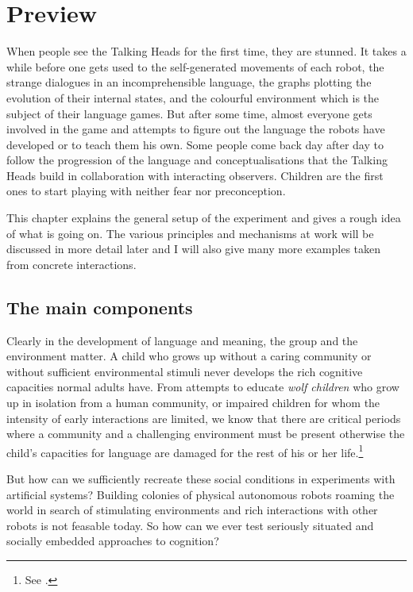 \chapter{Preview}
\label{chap:2}

\setcounter{foot}{1}
When people see the Talking Heads for the first time, they 
are stunned. It takes a while before
one gets used to the self-generated movements of each robot, 
the strange dialogues in an incomprehensible language, 
the graphs plotting the evolution of their internal
states, 
and the colourful environment which is the subject of their 
language games. But after some time, almost everyone gets involved 
in the game and attempts to figure out the language the robots
have developed or to teach them his own. 
Some people come back
day after day to follow the progression
of the language and conceptualisations that the Talking Heads 
build in collaboration with interacting observers.
Children are the first ones to 
start playing with neither fear nor preconception. 

This chapter explains the general setup of the 
experiment and gives a rough idea of what is going on. 
The various principles and mechanisms at work 
will be discussed in more detail later and I will also give many 
more examples taken from concrete interactions.

\section{The main components}

Clearly in the development of language and meaning, 
the group and the environment matter. A child 
who grows up without a caring 
community or without sufficient environmental stimuli
never develops the rich cognitive capacities 
normal adults have. From attempts to educate {\it wolf children}
who grow up in isolation from a human community, or 
impaired children for whom the intensity of early 
interactions are limited, we know that 
there are critical periods
where a community and a challenging environment must be
present otherwise the child's capacities for language
are damaged for the 
rest of his or her life.\footnote{See \cite{Tager:1994}.}

But how can we sufficiently 
recreate these social conditions in experiments 
with artificial systems? 
Building colonies of physical autonomous robots
roaming the world in search of stimulating 
environments and rich interactions with
other robots is not feasable today. So how 
can we ever test seriously situated and 
socially embedded approaches to cognition? 

